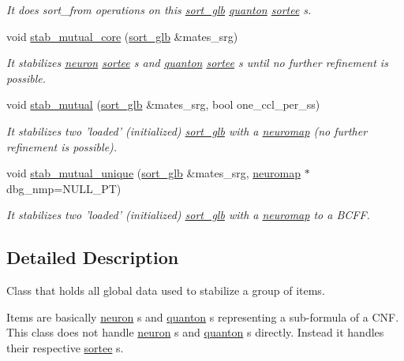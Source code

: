 \begin{DoxyCompactItemize}
\begin{DoxyCompactList}\small\item\em It does sort\+\_\+from operations on this \hyperlink{classsort__glb}{sort\+\_\+glb} \hyperlink{classquanton}{quanton} \hyperlink{classsortee}{sortee} s. \end{DoxyCompactList}\item 
void \hyperlink{classsort__glb_a314081679beafcbbeac7f2e504558f18}{stab\+\_\+mutual\+\_\+core} (\hyperlink{classsort__glb}{sort\+\_\+glb} \&mates\+\_\+srg)
\begin{DoxyCompactList}\small\item\em It stabilizes \hyperlink{classneuron}{neuron} \hyperlink{classsortee}{sortee} s and \hyperlink{classquanton}{quanton} \hyperlink{classsortee}{sortee} s until no further refinement is possible. \end{DoxyCompactList}\item 
void \hyperlink{classsort__glb_ad87061a8532cc773200ba06d939a6dfc}{stab\+\_\+mutual} (\hyperlink{classsort__glb}{sort\+\_\+glb} \&mates\+\_\+srg, bool one\+\_\+ccl\+\_\+per\+\_\+ss)
\begin{DoxyCompactList}\small\item\em It stabilizes two 'loaded' (initialized) \hyperlink{classsort__glb}{sort\+\_\+glb} with a \hyperlink{classneuromap}{neuromap} (no further refinement is possible). \end{DoxyCompactList}\item 
void \hyperlink{classsort__glb_abcd6c73d28df5efcf002c2aed63ccd92}{stab\+\_\+mutual\+\_\+unique} (\hyperlink{classsort__glb}{sort\+\_\+glb} \&mates\+\_\+srg, \hyperlink{classneuromap}{neuromap} $\ast$dbg\+\_\+nmp=N\+U\+L\+L\+\_\+\+P\+T)
\begin{DoxyCompactList}\small\item\em It stabilizes two 'loaded' (initialized) \hyperlink{classsort__glb}{sort\+\_\+glb} with a \hyperlink{classneuromap}{neuromap} to a B\+C\+F\+F. \end{DoxyCompactList}\end{DoxyCompactItemize}


\subsection{Detailed Description}
Class that holds all global data used to stabilize a group of items. 

Items are basically \hyperlink{classneuron}{neuron} s and \hyperlink{classquanton}{quanton} s representing a sub-\/formula of a C\+N\+F. This class does not handle \hyperlink{classneuron}{neuron} s and \hyperlink{classquanton}{quanton} s directly. Instead it handles their respective \hyperlink{classsortee}{sortee} s. 

